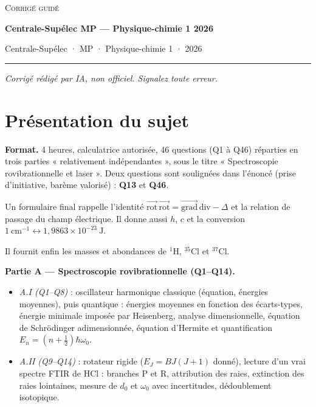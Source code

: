 \documentclass[11pt,a4paper]{article}
\providecommand{\tightlist}{\setlength{\itemsep}{0pt}\setlength{\parskip}{0pt}}
\begin{document}
\thispagestyle{plain}
\begin{center}
  {\small\scshape Corrigé guidé}\par\smallskip
  {\LARGE\bfseries Centrale-Supélec MP — Physique-chimie 1 2026\par}\medskip
  {\large Centrale-Supélec · MP · Physique-chimie 1 · 2026\par}
\end{center}
\vspace{2pt}\hrule\vspace{8pt}

\emph{Corrigé rédigé par IA, non officiel. Signalez toute erreur.}

\hypertarget{pruxe9sentation-du-sujet}{%
\section{Présentation du sujet}\label{pruxe9sentation-du-sujet}}

\textbf{Format.} 4 heures, calculatrice autorisée, 46 questions (Q1 à Q46) réparties en trois parties « relativement indépendantes », sous le titre « Spectroscopie rovibrationnelle et laser ». Deux questions sont soulignées dans l'énoncé (prise d'initiative, barème valorisé) : \textbf{Q13} et \textbf{Q46}.

Un formulaire final rappelle l'identité \(\overrightarrow{\mathrm{rot}}\,\overrightarrow{\mathrm{rot}}=\overrightarrow{\mathrm{grad}}\,\mathrm{div}-\Delta\) et la relation de passage du champ électrique. Il donne aussi \(h\), \(c\) et la conversion \(1\ \mathrm{cm^{-1}}\leftrightarrow1{,}9863\times10^{-23}\ \mathrm J\).

Il fournit enfin les masses et abondances de \(^1\)H, \(^{35}\)Cl et \(^{37}\)Cl.

\textbf{Partie A --- Spectroscopie rovibrationnelle (Q1--Q14).}

\begin{itemize}
\tightlist
\item
  \emph{A.I (Q1--Q8)} : oscillateur harmonique classique (équation, énergies moyennes), puis quantique : énergies moyennes en fonction des écarts-types, énergie minimale imposée par Heisenberg, analyse dimensionnelle, équation de Schrödinger adimensionnée, équation d'Hermite et quantification \(E_n=(n+\frac12)\hbar\omega_0\).
\item
  \emph{A.II (Q9--Q14)} : rotateur rigide (\(E_J=BJ(J+1)\) donné), lecture d'un vrai spectre FTIR de HCl : branches P et R, attribution des raies, extinction des raies lointaines, mesure de \(d_0\) et \(\omega_0\) avec incertitudes, dédoublement isotopique.
\end{itemize}
\end{document}
